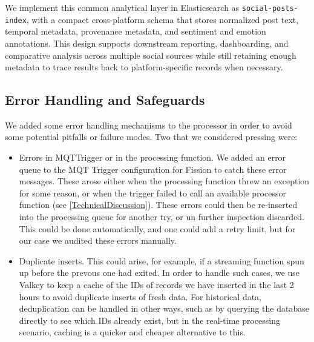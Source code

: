 We implement this common analytical layer in Elasticsearch as \texttt{social-posts-index}, with a compact cross-platform schema that stores normalized post text, temporal metadata, provenance metadata, and sentiment and emotion annotations. This design supports downstream reporting, dashboarding, and comparative analysis across multiple social sources while still retaining enough metadata to trace results back to platform-specific records when necessary. 


\subsection{Error Handling and Safeguards}
We added some error handling mechanisms to the processor in order to avoid some potential pitfalls or failure modes. Two that we considered pressing were:
\begin{itemize}
	\item Errors in MQTTrigger or in the processing function. We added an error queue to the MQT Trigger configuration for Fission to catch these error messages. These arose either when the processing function threw an exception for some reason, or when the trigger failed to call an available processor function (see \ref{TechnicalDiscussion}). These errors could then be re-inserted into the processing queue for another try, or un further inspection discarded. This could be done automatically, and one could add a retry limit, but for our case we audited these errors manually.
	
	\item Duplicate inserts. This could arise, for example, if a streaming function spun up before the prevous one had exited. In order to handle such cases, we use Valkey to keep a cache of the IDs of records we have inserted in the last 2 hours to avoid duplicate inserts of fresh data. For historical data, deduplication can be handled in other ways, such as by querying the database directly to see which IDs already exist, but in the real-time processing scenario, caching is a quicker and cheaper alternative to this.
\end{itemize}
